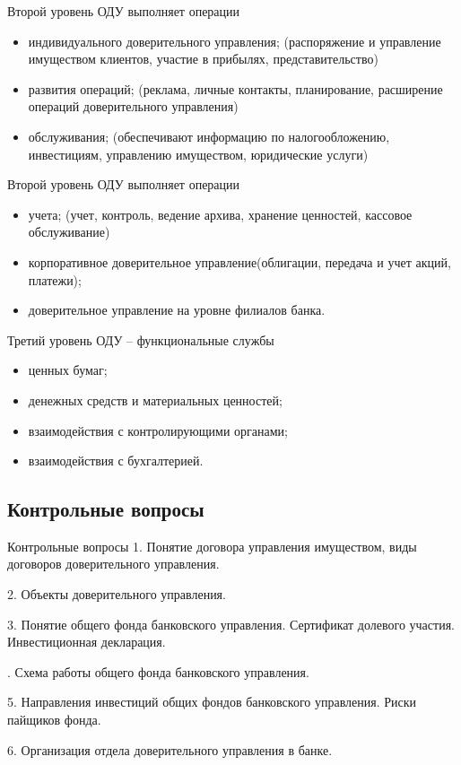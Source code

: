 \documentclass[_Banking_p3.tex]{subfiles}
\begin{document}
\begin{frame}{Второй уровень ОДУ выполняет операции}
\begin{itemize}[<+->]
\item
индивидуального доверительного управления; (распоряжение и управление имуществом клиентов, участие в прибылях, представительство)
\item
развития операций; (реклама, личные контакты, планирование, расширение операций доверительного управления)
\item
обслуживания; (обеспечивают информацию по налогообложению, инвестициям, управлению имуществом, юридические услуги)
\end{itemize}
\end{frame}

\begin{frame}{Второй уровень ОДУ выполняет операции}
\begin{itemize}[<+->]
\item
учета; (учет, контроль, ведение архива, хранение ценностей, кассовое обслуживание)
\item
корпоративное доверительное управление(облигации, передача и учет акций, платежи);
\item
доверительное управление на уровне филиалов банка. 
\end{itemize}
\end{frame}


\begin{frame}{Третий уровень ОДУ – функциональные службы}
\begin{itemize}[<+->]
\item
ценных бумаг;
\item
денежных средств и материальных ценностей;
\item
взаимодействия с контролирующими органами;
\item
взаимодействия с бухгалтерией.
\end{itemize}
\end{frame}


\subsection{Контрольные вопросы}
\begin{frame}[ allowframebreaks ]{Контрольные вопросы}
1. Понятие договора управления имуществом, виды договоров доверительного управления.

2. Объекты доверительного управления.

3. Понятие общего фонда банковского управления. Сертификат долевого участия. Инвестиционная декларация.

. Схема работы общего фонда банковского управления. 

5. Направления инвестиций общих фондов банковского управления. Риски пайщиков фонда.

6. Организация отдела доверительного управления в банке.

\end{frame}

\end{document}
